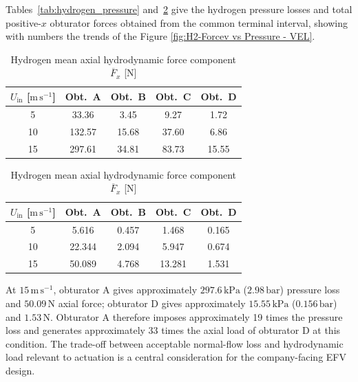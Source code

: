 Tables~\ref{tab:hydrogen_pressure} and~\ref{tab:hydrogen_force} give the hydrogen pressure losses and total positive-$x$ obturator forces obtained from the common terminal interval, showing with numbers the trends of the Figure \ref{fig:H2-Forcev vs Pressure - VEL}.\\

\begin{table}[htbp]
\centering
\begin{tabular}{@{}ccccc@{}}
\toprule
$U_{\mathrm{in}}$ [$\mathrm{m\,s^{-1}}$] & \textbf{Obt.\ A} & \textbf{Obt.\ B} & \textbf{Obt.\ C} & \textbf{Obt.\ D}\\
\midrule
5  & 33.36 & 3.45 & 9.27 & 1.72\\
10 & 132.57 & 15.68 & 37.60 & 6.86\\
15 & 297.61 & 34.81 & 83.73 & 15.55\\
\bottomrule
\end{tabular}
\caption{Hydrogen mean inlet-to-outlet pressure loss $\overline{\Delta p}$ [kPa]}
\label{tab:hydrogen_pressure}

\vspace{10mm}

\begin{tabular}{@{}ccccc@{}}
\toprule
$U_{\mathrm{in}}$ [$\mathrm{m\,s^{-1}}$] & \textbf{Obt.\ A} & \textbf{Obt.\ B} & \textbf{Obt.\ C} & \textbf{Obt.\ D}\\
\midrule
5  & 5.616 & 0.457 & 1.468 & 0.165\\
10 & 22.344 & 2.094 & 5.947 & 0.674\\
15 & 50.089 & 4.768 & 13.281 & 1.531\\
\bottomrule
\end{tabular}
\caption{Hydrogen mean axial hydrodynamic force component $\overline{F}_x$ [N]}
\label{tab:hydrogen_force}
\end{table}

At $15\,\mathrm{m\,s^{-1}}$, obturator A gives approximately $297.6\,\mathrm{kPa}$ ($2.98\,\mathrm{bar}$) pressure loss and $50.09\,\mathrm{N}$ axial force; obturator D gives approximately $15.55\,\mathrm{kPa}$ ($0.156\,\mathrm{bar}$) and $1.53\,\mathrm{N}$. Obturator A therefore imposes approximately 19 times the pressure loss and generates approximately 33 times the axial load of obturator D at this condition. The trade-off between acceptable normal-flow loss and hydrodynamic load relevant to actuation is a central consideration for the company-facing EFV design.

